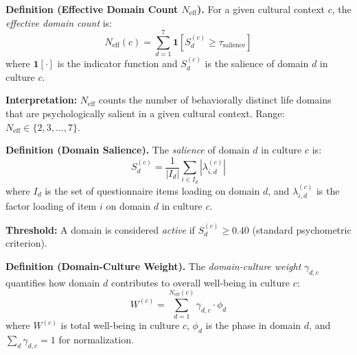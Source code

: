 \begin{tcolorbox}[colback=gray!5!white, colframe=gray!75!black, title=Definition BJ-D2: Effective Domain Count]
\textbf{Definition (Effective Domain Count $N_{\text{eff}}$).}
For a given cultural context $c$, the \textit{effective domain count} is:
\begin{equation}
N_{\text{eff}}(c) = \sum_{d=1}^{7} \mathbf{1}\left[ S_d^{(c)} \geq \tau_{\text{salience}} \right]
\label{eq:bj-neff-def}
\end{equation}
where $\mathbf{1}[\cdot]$ is the indicator function and $S_d^{(c)}$ is the salience of domain $d$ in culture $c$.

\textbf{Interpretation:} $N_{\text{eff}}$ counts the number of behaviorally distinct life domains
that are psychologically salient in a given cultural context. Range: $N_{\text{eff}} \in \{2, 3, \ldots, 7\}$.
\end{tcolorbox}

\begin{tcolorbox}[colback=gray!5!white, colframe=gray!75!black, title=Definition BJ-D3: Domain Salience]
\textbf{Definition (Domain Salience).}
The \textit{salience} of domain $d$ in culture $c$ is:
\begin{equation}
S_d^{(c)} = \frac{1}{|I_d|} \sum_{i \in I_d} |\lambda_{i,d}^{(c)}|
\label{eq:bj-salience-def}
\end{equation}
where $I_d$ is the set of questionnaire items loading on domain $d$, and $\lambda_{i,d}^{(c)}$ is
the factor loading of item $i$ on domain $d$ in culture $c$.

\textbf{Threshold:} A domain is considered \textit{active} if $S_d^{(c)} \geq 0.40$ (standard psychometric criterion).
\end{tcolorbox}

\begin{tcolorbox}[colback=gray!5!white, colframe=gray!75!black, title=Definition BJ-D4: Domain-Culture Interaction]
\textbf{Definition (Domain-Culture Weight).}
The \textit{domain-culture weight} $\gamma_{d,c}$ quantifies how domain $d$ contributes to overall
well-being in culture $c$:
\begin{equation}
W^{(c)} = \sum_{d=1}^{N_{\text{eff}}(c)} \gamma_{d,c} \cdot \phi_d
\label{eq:bj-wellbeing-decomp}
\end{equation}
where $W^{(c)}$ is total well-being in culture $c$, $\phi_d$ is the phase in domain $d$,
and $\sum_d \gamma_{d,c} = 1$ for normalization.
\end{tcolorbox}

